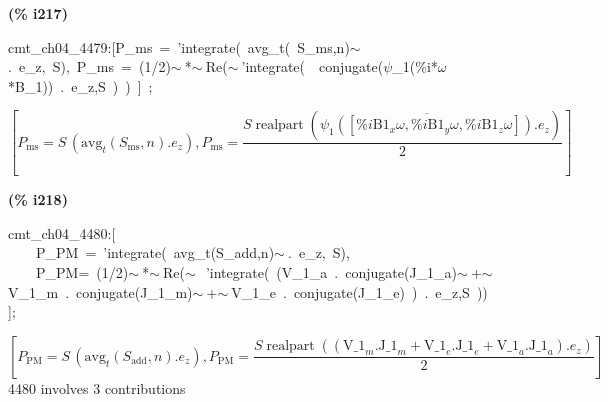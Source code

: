 \documentclass[fleqn]{article}
\begin{document}
\noindent
\begin{minipage}[t]{4.000000em}\color{red}\bfseries
(\% i217)	
\end{minipage}
\begin{minipage}[t]{\textwidth}\color{blue}
cmt\_ch04\_4479:[P\_ms\ =\ 'integrate(\ avg\_t(\ S\_ms,n)\ensuremath{\sim\ }.\ e\_z,\ S),\ P\_ms\ =\ (1/2)\ensuremath{\sim\ }*\ensuremath{\sim\ }Re(\ensuremath{\sim\ }'integrate(\ \ conjugate(\ensuremath{\psi}\_1(\%i*\ensuremath{\omega}*B\_1))\ .\ e\_z,S\ )\ )\ ]\ ;
\end{minipage}
\[\displaystyle \tag{\% o217} 
\left[ {P_{\ensuremath{\mathrm{ms}}}}=S\, \left( {{\ensuremath{\mathrm{avg}}}_t}\left( {S_{\ensuremath{\mathrm{ms}}}}\operatorname{,}n\right) \ensuremath{\mathrm{ . }}{e_z}\right) \operatorname{,}{P_{\ensuremath{\mathrm{ms}}}}=\frac{S \operatorname{realpart}\left( \overline{{{\psi }_1}\left( \left[ \% i {{\ensuremath{\mathrm{B1}}}_x} \omega \operatorname{,}\% i {{\ensuremath{\mathrm{B1}}}_y} \omega \operatorname{,}\% i {{\ensuremath{\mathrm{B1}}}_z} \omega \right] \right) }\ensuremath{\mathrm{ . }}{e_z}\right) }{2}\right] \mbox{}
\]


\noindent
\begin{minipage}[t]{4.000000em}\color{red}\bfseries
(\% i218)	
\end{minipage}
\begin{minipage}[t]{\textwidth}\color{blue}
cmt\_ch04\_4480:[\\
\ \ \ \ P\_PM\ =\ 'integrate(\ avg\_t(S\_add,n)\ensuremath{\sim\ }.\ e\_z,\ S),\\
\ \ \ \ P\_PM=\ (1/2)\ensuremath{\sim\ }*\ensuremath{\sim\ }Re(\ensuremath{\sim\ }\ 'integrate(\ (V\_1\_a\ .\ conjugate(J\_1\_a)\ensuremath{\sim\ }+\ensuremath{\sim\ }V\_1\_m\ .\ conjugate(J\_1\_m)\ensuremath{\sim\ }+\ensuremath{\sim\ }V\_1\_e\ .\ conjugate(J\_1\_e)\ )\ .\ e\_z,S\ ))\\
];
\end{minipage}
\[\displaystyle \tag{\% o218} 
\left[ {P_{\ensuremath{\mathrm{PM}}}}=S\, \left( {{\ensuremath{\mathrm{avg}}}_t}\left( {S_{\ensuremath{\mathrm{add}}}}\operatorname{,}n\right) \ensuremath{\mathrm{ . }}{e_z}\right) \operatorname{,}{P_{\ensuremath{\mathrm{PM}}}}=\frac{S \operatorname{realpart}\left( \left( {{\ensuremath{\mathrm{V\_ 1}}}_m}\ensuremath{\mathrm{ . }}{{\ensuremath{\mathrm{J\_ 1}}}_m}+{{\ensuremath{\mathrm{V\_ 1}}}_e}\ensuremath{\mathrm{ . }}{{\ensuremath{\mathrm{J\_ 1}}}_e}+{{\ensuremath{\mathrm{V\_ 1}}}_a}\ensuremath{\mathrm{ . }}{{\ensuremath{\mathrm{J\_ 1}}}_a}\right) \ensuremath{\mathrm{ . }}{e_z}\right) }{2}\right] \mbox{}
\]
4480 involves 3 contributions
\end{document}
